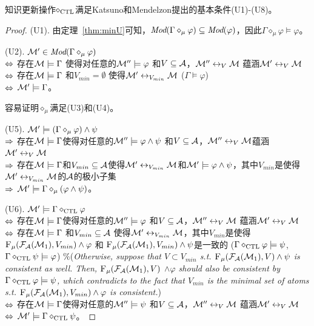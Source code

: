\begin{theorem}\label{thm:U1toU8}
	知识更新操作$\diamond_{\textrm{CTL}}$满足Katsuno和Mendelzon提出的基本条件(U1)-(U8)。
\end{theorem}
\begin{proof}
	(U1). 由定理~\ref{thm:minU}可知，$\textit{Mod}(\Gamma \diamond_{\mu} \varphi) \subseteq \textit{Mod}(\varphi)$，因此$\Gamma \diamond_{\mu} \varphi \models \varphi$。
	
	(U2). ${\cal M}'\in \textit{Mod}(\Gamma \diamond_{\mu} \varphi)$\\
	$\Leftrightarrow$ 存在${\cal M} \models \Gamma$ 使得对任意的${\cal M}'' \models \varphi$ 和$V \subseteq {\cal A}$，${\cal M}'' \leftrightarrow_{V} {\cal M}$ 蕴涵${\cal M}' \leftrightarrow_{V} {\cal M}$\\
	$\Leftrightarrow$ 存在${\cal M} \models \Gamma$ 和$V_{min} = \emptyset$ 使得${\cal M}' \leftrightarrow_{V_{min}} {\cal M}$ \hfill ($\Gamma \models \varphi$)\\
	$\Leftrightarrow$ ${\cal M}'\models \Gamma$。
	
	
	容易证明$\diamond_{\mu}$满足(U3)和(U4)。
	
	(U5). ${\cal M}'\models (\Gamma \diamond_{\mu} \varphi) \wedge \psi$\\
	$\Rightarrow$  存在${\cal M} \models \Gamma$使得对任意的${\cal M}'' \models \varphi \wedge \psi$ 和$V \subseteq {\cal A}$，${\cal M}'' \leftrightarrow_{V} {\cal M}$蕴涵${\cal M}' \leftrightarrow_{V} {\cal M}$\\
	$\Rightarrow$ 存在${\cal M} \models \Gamma$和$V_{min} \subseteq {\cal A}$使得${\cal M}' \leftrightarrow_{V_{min}} {\cal M}$和${\cal M}' \models \varphi \wedge \psi$，其中$V_{min}$是使得${\cal M}' \leftrightarrow_{V_{min}} {\cal M}$的${\cal A}$的极小子集\\
	$\Rightarrow$ ${\cal M}' \models \Gamma \diamond_{\mu} (\varphi \wedge \psi)$。
	
	
	
	(U6). ${\cal M}'\models \Gamma \diamond_{\textrm{CTL}} \varphi$\\
	$\Leftrightarrow$ 存在${\cal M} \models \Gamma$使得对任意的${\cal M}'' \models \varphi$ 和$V \subseteq {\cal A}$，${\cal M}'' \leftrightarrow_{V} {\cal M}$ 蕴涵${\cal M}' \leftrightarrow_{V} {\cal M}$\\
	$\Leftrightarrow$ 存在${\cal M} \models \Gamma$ 和$V_{min} \subseteq {\cal A}$ 使得${\cal M}' \leftrightarrow_{V_{min}} {\cal M}$，其中$V_{min}$是使得${\textsc{F}_{\textsc{$\mu$}}}({\cal F}_{{\cal A}}({\cal M}_1), V_{min}) \wedge \varphi$ 和 ${\textsc{F}_{\textsc{$\mu$}}}({\cal F}_{{\cal A}}({\cal M}_1), V_{min}) \wedge \psi$是一致的 \hfill ($\Gamma \diamond_{\textrm{CTL}} \varphi \models \psi$, $\Gamma \diamond_{\textrm{CTL}} \psi \models \varphi$)  \qquad \qquad \textcolor[RGB]{0,134,139}{$\%$({\em Otherwise, suppose that $V\subset V_{min}$ s.t. ${\textsc{F}_{\textsc{$\mu$}}}({\cal F}_{{\cal A}}({\cal M}_1), V) \wedge \psi$ is consistent as well. Then, ${\textsc{F}_{\textsc{$\mu$}}}({\cal F}_{{\cal A}}({\cal M}_1), V)$ $\wedge \varphi$ should also be consistent by $\Gamma \diamond_{\textrm{CTL}} \varphi \models \psi$, which contradicts to the fact that $V_{min}$ is the minimal set of atoms s.t. ${\textsc{F}_{\textsc{$\mu$}}}({\cal F}_{{\cal A}}({\cal M}_1), V_{min}) \wedge \varphi$ is consistent.})} \\
	$\Leftrightarrow$ 存在${\cal M} \models \Gamma$使得对任意的${\cal M}'' \models \psi$ 和$V \subseteq {\cal A}$，${\cal M}'' \leftrightarrow_{V} {\cal M}$ 蕴涵${\cal M}' \leftrightarrow_{V} {\cal M}$\\
	$\Leftrightarrow$ ${\cal M}' \models \Gamma \diamond_{\textrm{CTL}} \psi$。
	

\end{proof}
